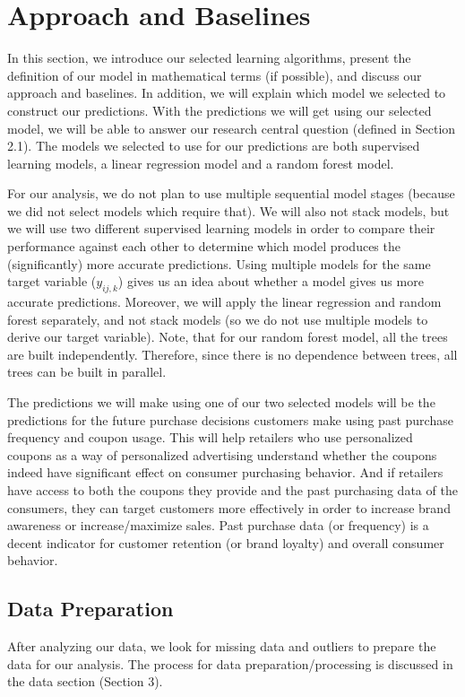 \section{Approach and Baselines}
In this section, we introduce our selected learning algorithms, present the
definition of our model in mathematical terms (if possible), and discuss our
approach and baselines. In addition, we will explain which model we selected to
construct our predictions. With the predictions we will get using our selected
model, we will be able to answer our research central question (defined in
Section 2.1). The models we selected to use for our predictions are both
supervised learning models, a linear regression model and a random forest model.

For our analysis, we do not plan to use multiple sequential model stages
(because we did not select models which require that). We
will also not stack models, but we will use two different supervised learning
models in order to compare their performance against each other to determine
which model produces the (significantly) more accurate predictions. Using
multiple models for the same target variable ($y_{ij,k}$) gives us an idea about
whether a model gives us more accurate predictions. Moreover, we will apply the
linear regression and random forest separately, and not stack models (so we
do not use multiple models to derive our target variable). Note, that
for our random forest model, all the trees are built independently. Therefore,
since there is no dependence between trees, all trees can be built in parallel.

The predictions we will make using one of our two selected models will be the
predictions for the future purchase decisions customers make using past purchase
frequency and coupon usage. This will help retailers who use personalized
coupons as a way of personalized advertising understand whether the coupons
indeed have significant effect on consumer purchasing behavior. And if retailers
have access to both the coupons they provide and the past purchasing data of the
consumers, they can target customers more effectively in order to increase brand
awareness or increase/maximize sales. Past purchase data (or frequency) is a
decent indicator for customer retention (or brand loyalty) and overall consumer
behavior.

\subsection{Data Preparation}
After analyzing our data, we look for missing data and outliers to prepare the
data for our analysis. The process for data preparation/processing 
is discussed in the data section (Section 3).

